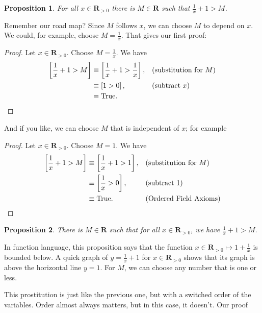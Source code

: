 \documentclass[12pt,fleqn,answers]{article}
\newcommand{\reals}{\mathbf{R}}
\newcommand{\true}{\mathrm{True}}
\newenvironment{myproof}
  {\begin{shaded}\begin{proof}}
  {\end{proof}\end{shaded}}
\newtheorem{prop}{Proposition}
\begin{document}
   


       
    \begin{prop} For all $x \in \reals_{>0}$ there is $M \in \reals$ such
     that $\frac{1}{x} +1 > M$. 
    \end{prop}
    \noindent Remember our road map? Since $M$ follows $x$, we can choose $M$ to depend on $x$. We could, for example, 
    choose $M = \frac{1}{x}$. That gives our first proof:
         \begin{myproof} 
      Let $x \in \reals_{>0}$. Choose $M = \frac{1}{x}$. We have
          \begin{align*}
          \left[\frac{1}{x}+1>M \right] &\equiv \left[\frac{1}{x}+1> \frac{1}{x} \right], &&\text{(substitution for $M$)} \\
                                  &\equiv \left [1 >0 \right], && \text{(subtract $x$)} \\
                                  &\equiv \true.   \qedhere
      \end{align*}
\end{myproof}
\noindent And if you like, we can choose $M$ that is independent of $x$; for example    
    \begin{myproof} 
      Let $x \in \reals_{>0}$. Choose $M = 1$. We have
          \begin{align*}
          \left[\frac{1}{x}+1>M \right] &\equiv \left[\frac{1}{x}+1>1\right], &&\text{(substitution for $M$)} \\
                                  &\equiv \left [\frac{1}{x}>0 \right],
                                  &&\text {(subtract 1)}\\
                                  &\equiv \true. &&\text {(Ordered Field Axioms)} \qedhere
      \end{align*}
\end{myproof}

    \begin{prop}
      There is $M \in \reals$ such that for all $x \in \reals_{>0}$,
     we have $\frac{1}{x} + 1 > M$. 
    \end{prop}
    \noindent In function language, this proposition  says that the function $x \in \reals_{>0} \mapsto 1+\frac{1}{x}$ is bounded below.
        A quick graph of $ y = \frac{1}{x} + 1 $ for  $x \in \reals_{>0}$ shows that its graph is above the horizontal line $y = 1$. For $M$, 
    we can choose any number that is one or less.
    
    This prostitution is just like the previous one, but with a switched order of the variables.  Order almost always matters, but in this case, it 
    doesn't. Our proof
    
\end{document}
